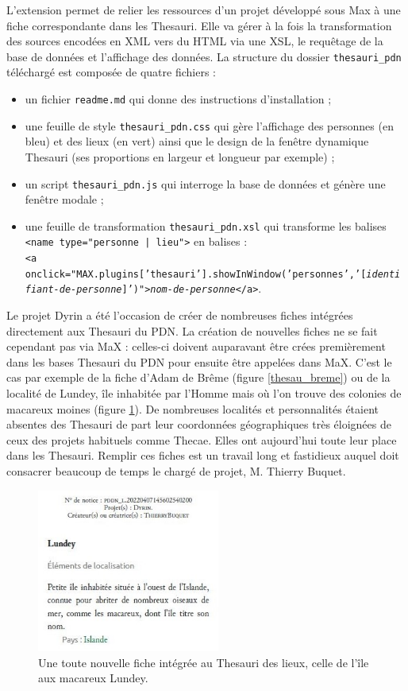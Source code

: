 \documentclass[a4paper,12pt,twoside]{book}
\begin{document}
L'extension permet de relier les ressources d'un projet développé sous Max à une fiche correspondante dans les Thesauri. Elle va gérer à la fois la transformation des sources encodées en XML vers du \acrshort{HTML} via une \acrshort{XSL}, le requêtage de la base de données et l'affichage des données. La structure du dossier \texttt{thesauri\_pdn} téléchargé est composée de quatre fichiers :
\begin{itemize}
    \item un fichier \texttt{readme.md} qui donne des instructions d'installation ;
    \item une feuille de style  \texttt{thesauri\_pdn.css} qui gère l'affichage des personnes (en bleu) et des lieux (en vert) ainsi que le design de la fenêtre dynamique Thesauri (ses proportions en largeur et longueur par exemple) ;
    \item un script \texttt{thesauri\_pdn.js} qui interroge la base de données et génère une fenêtre modale ;
    \item une feuille de transformation \texttt{thesauri\_pdn.xsl} qui transforme les balises \\\texttt{<name type="personne | lieu">} en balises :\\\texttt{<a onclick="MAX.plugins['thesauri'].showInWindow('personnes','[\textit{identi\\fiant-de-personne}]')">\textit{nom-de-personne}</a>}.
\end{itemize}

Le projet Dyrin a été l'occasion de créer de nombreuses fiches intégrées directement aux Thesauri du \acrshort{PDN}. La création de nouvelles fiches ne se fait cependant pas via MaX : celles-ci doivent auparavant être crées premièrement dans les bases Thesauri du \acrshort{PDN} pour ensuite être appelées dans MaX.  C'est le cas par exemple de la fiche d'Adam de Brême (figure \ref{thesau_breme}) ou de la localité de Lundey, île inhabitée par l'Homme mais où l'on trouve des colonies de macareux moines (figure \ref{lundey}). De nombreuses localités et personnalités étaient absentes des Thesauri de part leur coordonnées géographiques très éloignées de ceux des projets habituels comme Thecae. Elles ont aujourd'hui toute leur place dans les Thesauri. Remplir ces fiches est un travail long et fastidieux auquel doit consacrer beaucoup de temps le chargé de projet, M. Thierry Buquet.

\begin{figure}[H]
    \centering
    \includegraphics[width=6cm]{img/partie_3/lundey.JPG}
    \caption{Une toute nouvelle fiche intégrée au Thesauri des lieux, celle de l'île aux macareux Lundey.}
    \label{lundey}
\end{figure}
\end{document}
